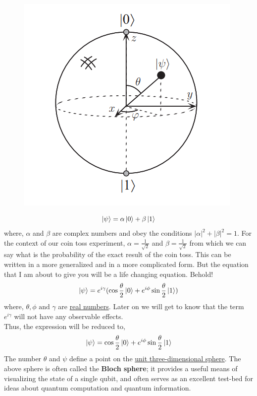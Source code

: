 \documentclass{article}
\begin{document}
\begin{figure}[h]
    \centering
    \includegraphics{bloch_sphere.png}
    
\end{figure}
\begin{equation}
    \ket{\psi} = \alpha\ket{0} + \beta\ket{1}
\end{equation}
where, $\alpha$ and $\beta$ are complex numbers and obey the conditions $|\alpha|^{2} + |\beta|^{2} = 1$. For the context of our coin toss experiment, $\alpha = \frac{1}{\sqrt{2}}$ and $\beta = \frac{1}{\sqrt{2}}$ from which we can say what is the probability of the exact result of the coin toss. This can be written in a more generalized and in a more complicated form. But the equation that I am about to give you will be a life changing equation. Behold!
\begin{equation}
    \ket{\psi} = e^{i\gamma}(\cos{\frac{\theta}{2}}\ket{0}+e^{i\phi}\sin{\frac{\theta}{2}}\ket{1})
\end{equation}
where, $\theta,\phi \text{ and } \gamma$ are \underline{real numbers}. Later on we will get to know that the term $e^{i\gamma}$ will not have any observable effects.\\
Thus, the expression will be reduced to,
\begin{equation}
    \ket{\psi} = \cos{\frac{\theta}{2}}\ket{0}+e^{i\phi}\sin{\frac{\theta}{2}}\ket{1}
\end{equation}
The number $\theta$ and $\psi$ define a point on the \underline{unit three-dimensional  sphere}.
The above sphere is often called the \textbf{Bloch sphere}; it provides a useful means of visualizing the state of a single qubit, and often serves as an excellent test-bed for ideas about quantum computation and quantum information.\\
\end{document}
